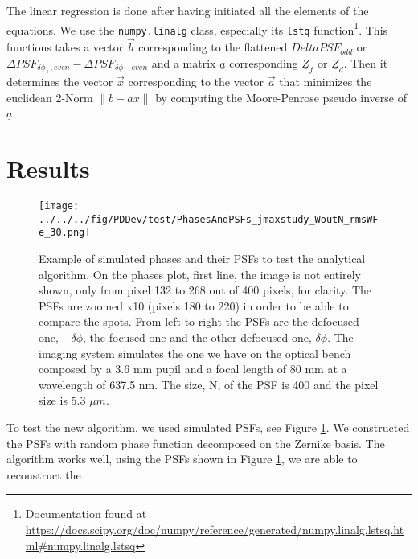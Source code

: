 The linear regression is done after having initiated all the elements of the equations. We use the \verb!numpy.linalg! class, especially its \verb!lstq! function\footnote{Documentation found at \url{https://docs.scipy.org/doc/numpy/reference/generated/numpy.linalg.lstsq.html\#numpy.linalg.lstsq}}. This functions takes a vector $\vec{b}$ corresponding to the flattened $Delta PSF_{odd}$ or $\Delta PSF_{\delta\phi_+, even}-\Delta PSF_{\delta\phi_-, even}$ and a matrix  $\underline{a}$ corresponding $\underline{Z}_f$ or $\underline{Z}_d$. Then it determines the vector $\vec{x}$ corresponding to the vector $\vec{a}$ that minimizes the euclidean 2-Norm $\lVert b-ax \rVert$ by computing the Moore-Penrose pseudo inverse of $\underline{a}$.

\section{Results}
\label{sec:ourPDresult}

\begin{figure}
\begin{center}
\texttt{[image: ../../../fig/PDDev/test/PhasesAndPSFs\_jmaxstudy\_WoutN\_rmsWFe\_30.png]}
\decoRule
\caption{Example of simulated phases and their PSFs to test the analytical algorithm. On the phases plot, first line, the image is not entirely shown, only from pixel 132 to 268 out of 400 pixels, for clarity. The PSFs are zoomed x10 (pixels 180 to 220) in order to be able to compare the spots. From left to right the PSFs are the defocused one, $-\delta\phi$, the focused one and the other defocused one, $\delta\phi$. The imaging system simulates the one we have on the optical bench composed by a 3.6 mm pupil and a focal length of 80 mm at a wavelength of 637.5 nm. The size, N, of the PSF is 400 and the pixel size is 5.3 $\mu m$.}
\label{fig:simPhasesAndPSFs}
\end{center}
\end{figure}

To test the new algorithm, we used simulated PSFs, see Figure \ref{fig:simPhasesAndPSFs}. We constructed the PSFs with random phase function decomposed on the Zernike basis. The algorithm works well, using the PSFs shown in Figure \ref{fig:simPhasesAndPSFs}, we are able to reconstruct the 


